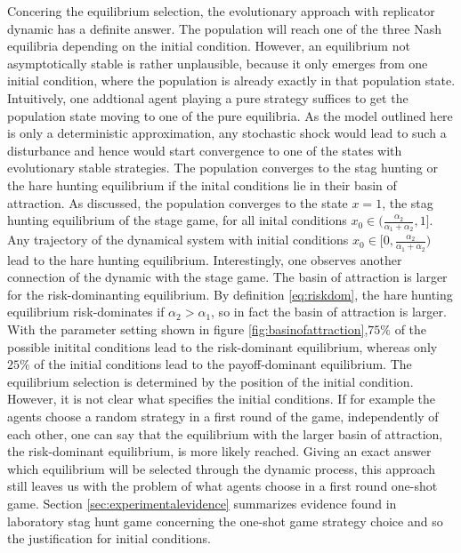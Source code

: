\documentclass[11pt]{article}
\begin{document}
Concering the equilibrium selection, the evolutionary approach with replicator
dynamic has a definite answer. The population will reach one of the three
Nash equilibria depending on the initial condition. 
However, an equilibrium not asymptotically stable is rather unplausible,
because it only emerges from one initial condition, where the population
is already exactly in that population state. 
Intuitively, one addtional agent playing
a pure strategy suffices to get the population state moving to one of the
pure equilibria. As the model outlined here is only a deterministic
approximation, any stochastic shock would lead to such a disturbance and hence
would start convergence to one of the states with evolutionary stable 
strategies.
The population converges to the stag hunting or the hare
hunting equilibrium if the inital conditions lie in their basin of attraction.
As discussed, the population converges to the state $x=1$, the stag hunting 
equilibrium of the stage game, for all inital conditions 
$x_0 \in (\frac{\alpha_2}{\alpha_1+\alpha_2},1]$. Any trajectory of the 
dynamical system with initial conditions 
$x_0 \in [0,\frac{\alpha_2}{\alpha_1+\alpha_2})$ lead to the hare hunting
equilibrium. Interestingly, one observes another connection of the 
dynamic with the stage game. The basin of attraction is larger for the
risk-dominanting equilibrium. By definition \eqref{eq:riskdom}, 
the hare hunting equilibrium risk-dominates if $\alpha_2 > \alpha_1$,
so in fact the basin of attraction is larger. With the parameter setting shown
in figure \ref{fig:basinofattraction},$75\%$ of the possible initital 
conditions lead to the risk-dominant equilibrium, whereas only $25\%$ of the 
initial conditions lead to the payoff-dominant equilibrium. 
The equilibrium selection is determined by the position of the initial
condition. However, it is not clear what specifies the initial conditions. 
If for example the agents choose a random strategy in a first round of the 
game, independently of each other, one can say that the equilibrium with the
larger basin of attraction, the risk-dominant equilibrium, is more likely 
reached.  
Giving an exact answer which equilibrium will be selected through the dynamic
process, this approach still leaves us with the problem of what agents 
choose in a first round one-shot game. Section \ref{sec:experimentalevidence} 
summarizes evidence found in laboratory stag hunt game concerning the 
one-shot game strategy choice and so the justification for initial conditions.
\end{document}
